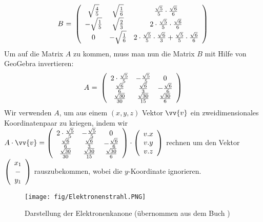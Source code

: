 $$\mbox{$B$ = } \left(\begin{array}{ccc} \sqrt{\frac{4}{5}}&\sqrt{\frac{1}{6}}&\frac{\sqrt{5}}{5} \cdot \frac{\sqrt{6}}{6}\\ -\sqrt{\frac{1}{5}}&\sqrt{\frac{2}{3}}&2 \cdot \frac{\sqrt{5}}{5} \cdot \frac{\sqrt{6}}{6}\\ 0&-\sqrt{\frac{1}{6}}&2 \cdot \frac{\sqrt{5}}{5} \cdot \frac{\sqrt{6}}{3} + \frac{\sqrt{5}}{5} \cdot \frac{\sqrt{6}}{6}\\ \end{array}\right)$$
Um auf die Matrix $A$ zu kommen, muss man nun die Matrix $B$ mit Hilfe von GeoGebra invertieren:
$$\mbox{$A$ = } \left(\begin{array}{ccc} 2\cdot\frac{\sqrt{5}}{5}&-\frac{\sqrt{5}}{5}&0\\ \frac{\sqrt{6}}{6}&\frac{\sqrt{6}}{3}&-\frac{\sqrt{6}}{6}\\ \frac{\sqrt{30}}{30}&\frac{\sqrt{30}}{15}&\frac{\sqrt{30}}{6}\\ \end{array}\right)$$
Wir verwenden $A$, um aus einem $(x,y,z)$ Vektor $\vv{v}$ ein zweidimensionales Koordinatenpaar zu kriegen, indem wir $ A \cdot \vv{v} = \m {2\cdot\frac{\sqrt{5}}{5}}{-\frac{\sqrt{5}}{5}}{0}{\frac{\sqrt{6}}{6}}{\frac{\sqrt{6}}{3}}{-\frac{\sqrt{6}}{6}}{\frac{\sqrt{30}}{30}}{\frac{\sqrt{30}}{15}}{\frac{\sqrt{30}}{6}} \cdot \vektor{v.x}{v.y}{v.z}$ rechnen um den Vektor $ \left(\begin{array}{c}x_1\\-\\y_1\end{array}\right)$ rauszubekommen, wobei die $y$-Koordinate ignorieren.  

\begin{figure}[h]
    \centering
    \texttt{[image: fig/Elektronenstrahl.PNG]}
    \caption{Darstellung der Elektronenkanone (übernommen aus dem Buch \cite{Fernsehroehre})}
    \label{fig:elS}
\end{figure}